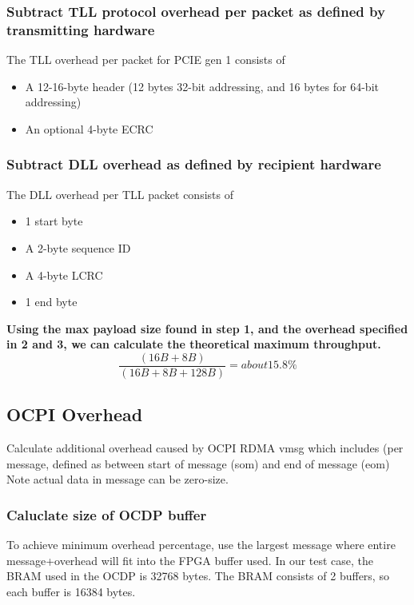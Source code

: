 \subsubsection{Subtract TLL protocol overhead per packet as defined by transmitting hardware}

The TLL overhead per packet for PCIE gen 1 consists of
\begin{itemize}

\item{A 12-16-byte header (12 bytes 32-bit addressing, and 16 bytes for 64-bit addressing)  }
\item{An optional 4-byte ECRC}
\end{itemize}
\subsubsection{Subtract DLL overhead as defined by recipient hardware}

The DLL overhead per TLL packet consists of

\begin{itemize}

\item{1 start byte}
\item{A 2-byte sequence ID}
\item{A 4-byte LCRC}
\item{1 end byte}
\end{itemize}

\textbf{Using the max payload size found in step 1, and the overhead specified in 2 and 3, we can calculate the theoretical maximum throughput.}
\[\frac{(16B + 8B)}{(16B + 8B + 128B)}= about 15.8\%\]

\subsection{OCPI Overhead}
Calculate additional overhead caused by OCPI RDMA vmsg which includes (per message, defined as between start of message (som) and end of message (eom)\\

Note actual data in message can be zero-size.
\subsubsection{Caluclate size of OCDP buffer}
To achieve minimum overhead percentage, use the largest message where entire message+overhead will fit into the FPGA buffer used.  In our test case, the BRAM used in the OCDP is 32768 bytes.  The BRAM consists of 2 buffers, so each buffer is 16384 bytes.

